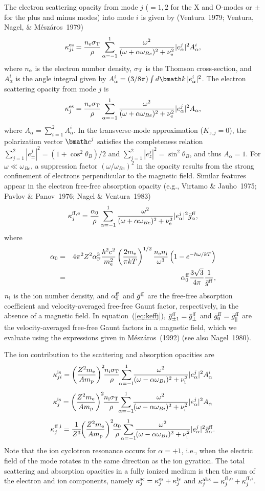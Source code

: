 \documentclass{mn2e}
\newcommand{\be}{\begin{equation}}
\newcommand{\ee}{\end{equation}}
\newcommand{\ba}{\begin{eqnarray}}
\newcommand{\ea}{\end{eqnarray}}
\newcommand{\lp}{\left(}
\newcommand{\rp}{\right)}
\newcommand{\mpr}{m_{\rm p}}
\newcommand{\me}{m_{\rm e}}
\newcommand{\sigth}{\sigma_{\rm T}}
\newcommand{\alphaf}{\alpha_{\rm F}}
\newcommand{\veck}{{\bmath k}}
\newcommand{\vece}{{\bmath e}}
\newcommand{\kffj}{\kappa^{\rm ff,e}_j}
\newcommand{\kiffj}{\kappa^{\rm ff,i}_j}
\newcommand{\kabsj}{\kappa^{\rm abs}_j}
\newcommand{\kscj}{\kappa^{\rm sc}_j}
\newcommand{\kesj}{\kappa^{\rm es}_j}
\newcommand{\kesji}{\kappa^{\rm es}_{ji}}
\newcommand{\kisji}{\kappa^{\rm is}_{ji}}
\newcommand{\kisj}{\kappa^{\rm is}_j}
\newcommand{\gff}{\bar{g}^{\rm ff}}
\newcommand{\nel}{n_{\rm e}}
\newcommand{\nion}{n_{\rm i}}
\newcommand{\omegab}{\omega_{Be}}
\newcommand{\omegabi}{\omega_{Bi}}
\newcommand{\thetab}{\theta_B}
\newcommand{\nudamp}{\nu_{\rm e}}
\newcommand{\nudampi}{\nu_{\rm i}}
\begin{document}
{The electron scattering opacity from mode $j$ ($=1,2$ for the
X and O-modes or $\pm$ for the plus and minus modes) into mode $i$
is given by (Ventura~1979; Ventura, Nagel, \& M\'{e}sz\'{a}ros~1979)
\be
\kesji = \frac{\nel\sigth}{\rho}\sum_{\alpha=-1}^1
 \frac{\omega^2}{(\omega+\alpha\omegab)^2+\nudamp^2}|e_\alpha^j|^2A_\alpha^i,
 \label{eq:kesji}
\ee
where $\nel$ is the electron number density, $\sigth$ is the
Thomson cross-section, and $A_\alpha^i$ is the angle integral
given by $A_\alpha^i = (3/8\pi)\int d\veck\,|e_\alpha^i|^2$.
The electron scattering opacity from mode $j$ is
\be
\kesj = \frac{\nel\sigth}{\rho}\sum_{\alpha=-1}^1
 \frac{\omega^2}{(\omega+\alpha\omegab)^2+\nudamp^2}|e_\alpha^j|^2 A_\alpha,
 \label{eq:kesj}
\ee
where $A_\alpha=\sum_{i=1}^2 A_\alpha^i$.  In the transverse-mode
approximation ($K_{z,j}=0$), the polarization vector $\vece^j$
satisfies the completeness relation
$\sum_{j=1}^2 |e_\pm^j|^2 = \lp 1+\cos^2\!\thetab\rp/2$
and $\sum_{j=1}^2 |e_z^j|^2 = \sin^2\!\thetab$, and thus $A_\alpha=1$.
For $\omega\ll\omegab$, a suppression factor $(\omega/\omegab)^2$
in the opacity results from the strong confinement of electrons
perpendicular to the magnetic field.  Similar features appear
in the electron free-free absorption opacity
(e.g., Virtamo \& Jauho~1975; Pavlov \& Panov~1976; Nagel \& Ventura~1983)
\be
\kffj = \frac{\alpha_0}{\rho}\sum_{\alpha=-1}^1
 \frac{\omega^2}{(\omega+\alpha\omegab)^2+\nudamp^2}|e_\alpha^j|^2\gff_\alpha,
 \label{eq:keffj}
\ee
where
\ba
\alpha_0 & = & 4\pi^2 Z^2\alphaf^3\frac{\hbar^2 c^2}{\me^2}
 \lp\frac{2\me}{\pi kT}\rp^{1/2} \frac{\nel\nion}{\omega^3}
 \lp 1-e^{-\hbar\omega/kT}\rp \nonumber \\
 & = & \alpha^{\rm ff}_0 \frac{3\sqrt{3}}{4\pi}
 \frac{1}{\gff}, \label{eq:kffmagcoef}
\ea
$\nion$ is the ion number density, and
$\alpha^{\rm ff}_0$ and $\gff$ are the free-free
absorption coefficient and velocity-averaged free-free Gaunt
factor, respectively, in the absence of a magnetic field.
In equation~(\ref{eq:keffj}), $\gff_{\pm 1}=\gff_\perp$ and
$\gff_0=\gff_\parallel$ are the velocity-averaged free-free
Gaunt factors in a magnetic field, which we evaluate using
the expressions given in M\'{e}sz\'{a}ros~(1992)
(see also Nagel~1980).

The ion contribution to the scattering and absorption opacities are
\be
\kisji = \lp\frac{Z^2\me}{A\mpr}\rp^2\!\! \frac{\nion\sigth}{\rho}
 \!\!\sum_{\alpha=-1}^1\!\!\frac{\omega^2}{(\omega-\alpha\omegabi)^2+\nudampi^2}
 |e_\alpha^j|^2A_\alpha^i \label{eq:kisji}
\ee
\be
\kisj = \lp\frac{Z^2\me}{A\mpr}\rp^2\!\!\frac{\nion\sigth}{\rho}
 \!\!\sum_{\alpha=-1}^1\!\!\frac{\omega^2}{(\omega-\alpha\omegabi)^2+\nudampi^2}
 |e_\alpha^j|^2 A_\alpha \label{eq:kisj}
\ee
\be
\kiffj = \frac{1}{Z^3}\!\!\lp\frac{Z^2\me}{A\mpr}\rp^2\!\!\frac{\alpha_0}{\rho}
 \!\!\sum_{\alpha=-1}^1\!\!\frac{\omega^2}{(\omega-\alpha\omegabi)^2+\nudampi^2}
 |e_\alpha^j|^2\gff_\alpha. \label{eq:kiffj}
\ee
Note that the ion cyclotron resonance occurs for $\alpha=+1$, i.e.,
when the electric field of the mode rotates in the same direction
as the ion gyration.
The total scattering and absorption opacities in a fully ionized
medium is then the sum of the electron and ion components, namely
$\kscj = \kesj + \kisj$ and $\kabsj = \kffj + \kiffj$.

}
\end{document}
